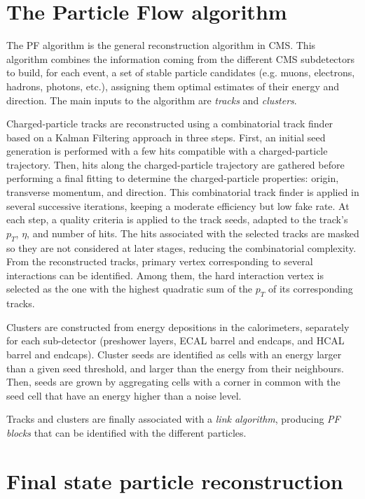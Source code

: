 \documentclass[../main.tex]{subfiles}
\begin{document}
\section{The Particle Flow algorithm}
\label{intro:sec:pf}

The PF algorithm is the general reconstruction algorithm in CMS. This algorithm combines the information coming from the different CMS subdetectors to build, for each event, a set of stable particle candidates (e.g. muons, electrons, hadrons, photons, etc.), assigning them optimal estimates of their energy and direction. The main inputs to the algorithm are \textit{tracks} and \textit{clusters}.

Charged-particle tracks are reconstructed using a combinatorial track finder based on a Kalman Filtering approach \cite{intro:id:kalman} in three steps. First, an initial seed generation is performed with a few hits compatible with a charged-particle trajectory. Then, hits along the charged-particle trajectory are gathered before performing a final fitting to determine the charged-particle properties: origin, transverse momentum, and direction. This combinatorial track finder is applied in several successive iterations, keeping a moderate efficiency but low fake rate. At each step, a quality criteria is applied to the track seeds, adapted to the track's $p_T$, $\eta$, and number of hits. The hits associated with the selected tracks are masked so they are not considered at later stages, reducing the combinatorial complexity. From the reconstructed tracks, primary vertex corresponding to several interactions can be identified. Among them, the hard interaction vertex is selected as the one with the highest quadratic sum of the $p_T$ of its corresponding tracks.

Clusters are constructed from energy depositions in the calorimeters, separately for each sub-detector (preshower layers, ECAL barrel and endcaps, and HCAL barrel and endcaps). Cluster seeds are identified as cells with an energy larger than a given seed threshold, and larger than the energy from their neighbours. Then, seeds are grown by aggregating cells with a corner in common with the seed cell that have an energy higher than a noise level.

Tracks and clusters are finally associated with a \textit{link algorithm}, producing \textit{PF blocks} that can be identified with the different particles. 


\section{Final state particle reconstruction}
\label{intro:sec:particle_reco}
\end{document}
